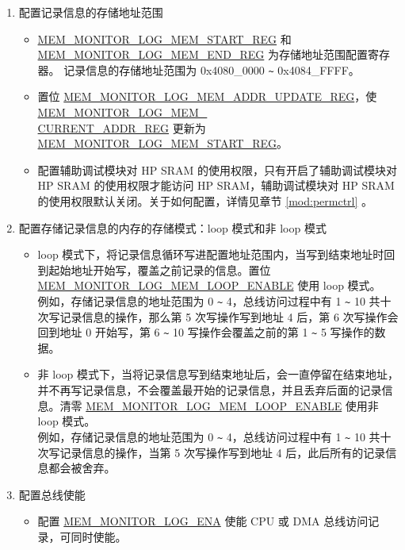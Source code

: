 \documentclass[main\_\_CN.tex]{subfiles}
\begin{document}
\begin{enumerate}
    \item 配置记录信息的存储地址范围
        \begin{itemize}
            \item \hyperref[regdesc:MEMMONITORLOGMEMSTARTREG]{MEM\_MONITOR\_LOG\_MEM\_START\_REG} 和 \hyperref[regdesc:MEMMONITORLOGMEMENDREG]{MEM\_MONITOR\_LOG\_MEM\_END\_REG} 为存储地址范围配置寄存器。 记录信息的存储地址范围为 0x4080\_0000 \verb+~+ 0x4084\_FFFF。
            \item 置位 \hyperref[regdesc:MEMMONITORLOGMEMADDRUPDATEREG]{MEM\_MONITOR\_LOG\_MEM\_ADDR\_UPDATE\_REG}，使 \hyperref[regdesc:MEMMONITORLOGMEMCURRENTADDRREG]{MEM\_MONITOR\_LOG\_MEM\_\\CURRENT\_ADDR\_REG} 更新为 \hyperref[regdesc:MEMMONITORLOGMEMSTARTREG]{MEM\_MONITOR\_LOG\_MEM\_START\_REG}。
            \item 配置辅助调试模块对 HP SRAM 的使用权限，只有开启了辅助调试模块对 HP SRAM 的使用权限才能访问 HP SRAM，辅助调试模块对 HP SRAM 的使用权限默认关闭。关于如何配置，详情见章节 \ref{mod:permctrl} \textit{}。
        \end{itemize}
    \item 配置存储记录信息的内存的存储模式：loop 模式和非 loop 模式
        \begin{itemize}
            \item loop 模式下，将记录信息循环写进配置地址范围内，当写到结束地址时回到起始地址开始写，覆盖之前记录的信息。置位 \hyperref[fielddesc:MEMMONITORLOGMEMLOOPENABLE]{MEM\_MONITOR\_LOG\_MEM\_LOOP\_ENABLE} 使用 loop 模式。\\
            例如，存储记录信息的地址范围为 0 \verb+~+ 4，总线访问过程中有 1 \verb+~+ 10 共十次写记录信息的操作，那么第 5 次写操作写到地址 4 后，第 6 次写操作会回到地址 0 开始写，第 6 \verb+~+ 10 写操作会覆盖之前的第 1 \verb+~+ 5 写操作的数据。
            \item 非 loop 模式下，当将记录信息写到结束地址后，会一直停留在结束地址，并不再写记录信息，不会覆盖最开始的记录信息，并且丢弃后面的记录信息。清零 \hyperref[fielddesc:MEMMONITORLOGMEMLOOPENABLE]{MEM\_MONITOR\_LOG\_MEM\_LOOP\_ENABLE} 使用非 loop 模式。\\
            例如，存储记录信息的地址范围为 0 \verb+~+ 4，总线访问过程中有 1 \verb+~+ 10 共十次写记录信息的操作，当第 5 次写操作写到地址 4 后，此后所有的记录信息都会被舍弃。
        \end{itemize}
     \item 配置总线使能
        \begin{itemize}
            \item 配置 \hyperref[fielddesc:MEMMONITORLOGENA]{MEM\_MONITOR\_LOG\_ENA} 使能 CPU 或 DMA 总线访问记录，可同时使能。
        \end{itemize}
\end{enumerate}
\end{document}
